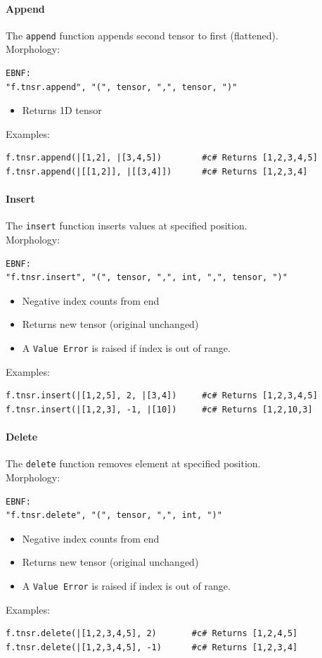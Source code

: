 \paragraph{Append}
The \texttt{append} function appends second tensor to first (flattened).\\
Morphology:
\begin{verbatim}
EBNF:
"f.tnsr.append", "(", tensor, ",", tensor, ")"
\end{verbatim}
\begin{itemize}
\item Returns 1D tensor
\end{itemize}
Examples:
\begin{verbatim}
f.tnsr.append(|[1,2], |[3,4,5])        #c# Returns [1,2,3,4,5]
f.tnsr.append(|[[1,2]], |[[3,4]])      #c# Returns [1,2,3,4]
\end{verbatim}

\paragraph{Insert}
The \texttt{insert} function inserts values at specified position.\\
Morphology:
\begin{verbatim}
EBNF:
"f.tnsr.insert", "(", tensor, ",", int, ",", tensor, ")"
\end{verbatim}
\begin{itemize}
\item Negative index counts from end
\item Returns new tensor (original unchanged)
\item A \texttt{Value Error} is raised if index is out of range.
\end{itemize}
Examples:
\begin{verbatim}
f.tnsr.insert(|[1,2,5], 2, |[3,4])     #c# Returns [1,2,3,4,5]
f.tnsr.insert(|[1,2,3], -1, |[10])     #c# Returns [1,2,10,3]
\end{verbatim}

\paragraph{Delete}
The \texttt{delete} function removes element at specified position.\\
Morphology:
\begin{verbatim}
EBNF:
"f.tnsr.delete", "(", tensor, ",", int, ")"
\end{verbatim}
\begin{itemize}
\item Negative index counts from end
\item Returns new tensor (original unchanged)
\item A \texttt{Value Error} is raised if index is out of range.
\end{itemize}
Examples:
\begin{verbatim}
f.tnsr.delete(|[1,2,3,4,5], 2)       #c# Returns [1,2,4,5]
f.tnsr.delete(|[1,2,3,4,5], -1)      #c# Returns [1,2,3,4]
\end{verbatim}

